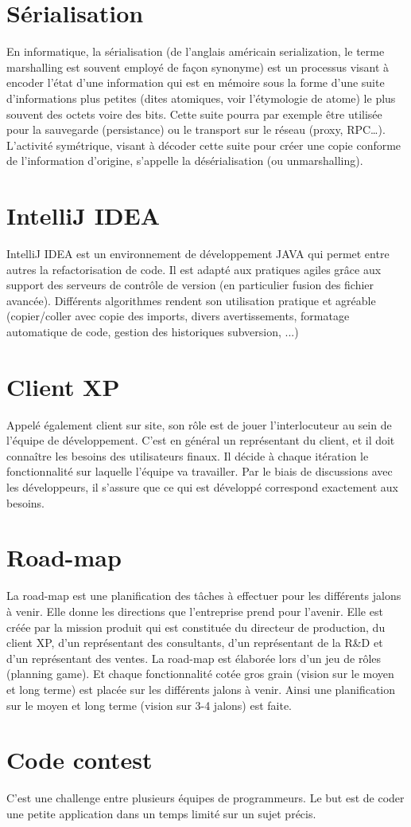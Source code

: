 \section{Sérialisation}\label{lexique:serialisation}
En informatique, la sérialisation (de l'anglais américain serialization, le terme marshalling est souvent employé de façon synonyme) est un processus visant à encoder l'état d'une information qui est en mémoire sous la forme d'une suite d'informations plus petites (dites atomiques, voir l'étymologie de atome) le plus souvent des octets voire des bits. Cette suite pourra par exemple être utilisée pour la sauvegarde (persistance) ou le transport sur le réseau (proxy, RPC…). L'activité symétrique, visant à décoder cette suite pour créer une copie conforme de l'information d'origine, s'appelle la désérialisation (ou unmarshalling).
\section{IntelliJ IDEA}\label{lexique:IDEA}
IntelliJ IDEA est un environnement de développement JAVA qui permet entre autres la refactorisation de code. Il est adapté aux pratiques agiles grâce aux support des serveurs de contrôle de version (en particulier fusion des fichier avancée). Différents algorithmes rendent son utilisation pratique et agréable (copier/coller avec copie des imports, divers avertissements, formatage automatique de code, gestion des historiques subversion, ...)
\section{Client XP}\label{lexique:clientXP}
Appelé également client sur site, son rôle est de jouer l'interlocuteur au sein de l'équipe de développement. C'est en général un représentant du client, et il doit connaître les besoins des utilisateurs finaux. Il décide à chaque itération le fonctionnalité sur laquelle l'équipe va travailler. Par le biais de discussions avec les développeurs, il s'assure que ce qui est développé correspond exactement aux besoins.
\section{Road-map}
La road-map est une planification des tâches à effectuer pour les différents jalons à venir. Elle donne les directions que l'entreprise prend pour l'avenir. Elle est créée par la mission produit qui est constituée du directeur de production, du client XP, d'un représentant des consultants, d'un représentant de la R\&D et d'un représentant des ventes. La road-map est élaborée lors d'un jeu de rôles (planning game). Et chaque fonctionnalité cotée gros grain (vision sur le moyen et long terme) est placée sur les différents jalons à venir. Ainsi une planification sur le moyen et long terme (vision sur 3-4 jalons) est faite.
\section{Code contest}\label{lexique:codeContest}
C'est une challenge entre plusieurs équipes de programmeurs. Le but est de coder une petite application dans un temps limité sur un sujet précis. 

